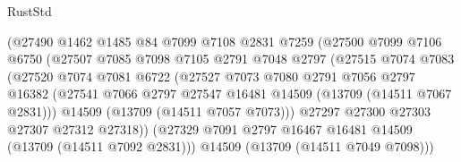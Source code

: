 \begin{lexlean}{RustStd}
\begin{coremodule}
                              (@27490
                                @1462
                                @1485
                                @84
                                @7099
                                @7108
                                @2831
                                @7259
                                (@27500
                                  @7099
                                  @7106
                                  @6750
                                  (@27507
                                    @7085
                                    @7098
                                    @7105
                                    @2791
                                    @7048
                                    @2797
                                    (@27515
                                      @7074
                                      @7083
                                      (@27520
                                        @7074
                                        @7081
                                        @6722
                                        (@27527
                                          @7073
                                          @7080
                                          @2791
                                          @7056
                                          @2797
                                          @16382
                                          (@27541
                                            @7066
                                            @2797
                                            @27547
                                            @16481
                                            @14509
                                            (@13709 (@14511 @7067 @2831)))
                                          @14509
                                          (@13709 (@14511 @7057 @7073)))
                                        @27297
                                        @27300
                                        @27303
                                        @27307
                                        @27312
                                        @27318))
                                    (@27329
                                      @7091
                                      @2797
                                      @16467
                                      @16481
                                      @14509
                                      (@13709 (@14511 @7092 @2831)))
                                    @14509
                                    (@13709 (@14511 @7049 @7098)))

\end{coremodule}
\end{lexlean}
